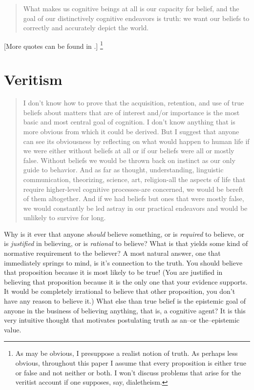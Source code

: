 \documentclass[12pt,numbers=noenddot]{scrartcl}
\begin{document}
\begin{quote}
What makes us cognitive beings at all is our capacity for belief, and the goal of our distinctively cognitive endeavors is truth: we want our beliefs to correctly and accurately depict the world. \parencite[7]{Bonjour1985}
\end{quote}

[More quotes can be found in \textcite{Goldman2002-GOLTUO-2}.]
\footnote{As may be obvious, I presuppose a realist notion of truth. As perhaps less obvious, throughout this paper I assume that every proposition is either true or false and not neither or both. I won't discuss problems that arise for the veritist account if one supposes, say, dialetheism.}
\section{Veritism}

\begin{quote}
I don't know how to prove that the acquisition, retention, and use of true beliefs about matters that are of interest and/or importance is the most basic and most central goal of cognition. I don't know anything that is more obvious from which it could be derived. But I suggest that anyone can see its obviousness by reflecting on what would happen to human life if we were either without beliefs at all or if our beliefs were all or mostly false. Without beliefs we would be thrown back on instinct as our only guide to behavior. And as far as thought, understanding, linguistic communication, theorizing, science, art, religion-all the aspects of life that require higher-level cognitive processes-are concerned, we would be bereft of them altogether. And if we had beliefs but ones that were mostly false, we would constantly be led astray in our practical endeavors and would be unlikely to survive for long. \parencite[30]{Alston2005-ALSBJD}
\end{quote}

Why is it ever that anyone \emph{should} believe something, or is \emph{required} to believe, or is \emph{justified} in believing, or is \emph{rational} to believe? What is that yields some kind of normative requirement to the believer? A most natural answer, one that immediately springs to mind, is it's connection to the truth. You should believe that proposition because it is most likely to be true! (You are justified in believing that proposition because it is the only one that your evidence supports. It would be completely irrational to believe that other proposition, you don't have any reason to believe it.) What else than true belief is the epistemic goal of anyone in the business of believing anything, that is, a cognitive agent? It is this very intuitive thought that motivates postulating truth as an–or the–epistemic value.
\end{document}

